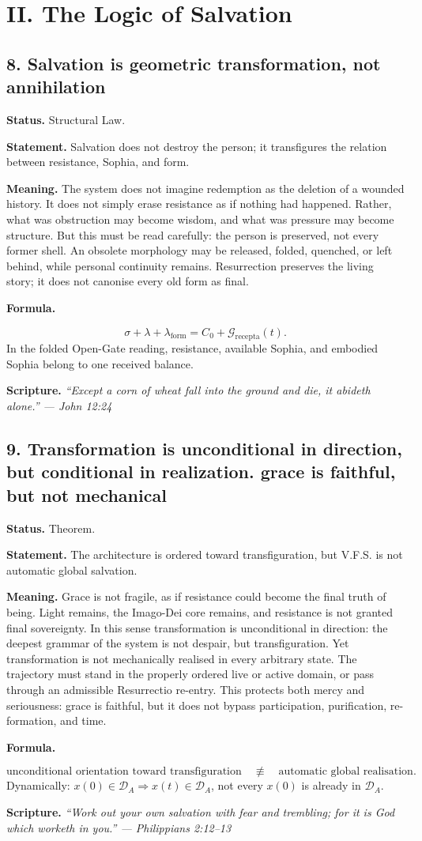 \documentclass[11pt]{article}
\newcommand{\Grec}{\mathcal{G}_{\mathrm{recepta}}}
\newcommand{\DA}{\mathcal{D}_A}
\newcommand{\lform}{\lambda_{\mathrm{form}}}
\newcommand{\thesis}[2]{%
  \subsection*{#1. #2}%
}
\newcommand{\status}[1]{\textbf{Status.} #1\par}
\newcommand{\statement}[1]{\textbf{Statement.} #1\par}
\newcommand{\explain}[1]{\textbf{Meaning.} #1\par}
\newcommand{\formula}[1]{\textbf{Formula.}\par #1\par}
\newcommand{\scripture}[2]{\textbf{Scripture.} {\small\itshape ``#1'' --- #2}\par}
\begin{document}
\section{II. The Logic of Salvation}

\thesis{8}{Salvation is geometric transformation, not annihilation}
\status{Structural Law.}
\statement{Salvation does not destroy the person; it transfigures the relation between resistance, Sophia, and form.}
\explain{The system does not imagine redemption as the deletion of a wounded history. It does not simply erase resistance as if nothing had happened. Rather, what was obstruction may become wisdom, and what was pressure may become structure. But this must be read carefully: the person is preserved, not every former shell. An obsolete morphology may be released, folded, quenched, or left behind, while personal continuity remains. Resurrection preserves the living story; it does not canonise every old form as final.}
\formula{\[
  \sigma+\lambda+\lform=C_0+\Grec(t).
\]
In the folded Open-Gate reading, resistance, available Sophia, and embodied Sophia belong to one received balance.}
\scripture{Except a corn of wheat fall into the ground and die, it abideth alone.}{John 12:24}

\thesis{9}{Transformation is unconditional in direction, but conditional in realization. grace is faithful, but not mechanical}
\status{Theorem.}
\statement{The architecture is ordered toward transfiguration, but V.F.S. is not automatic global salvation.}
\explain{Grace is not fragile, as if resistance could become the final truth of being. Light remains, the Imago-Dei core remains, and resistance is not granted final sovereignty. In this sense transformation is unconditional in direction: the deepest grammar of the system is not despair, but transfiguration. Yet transformation is not mechanically realised in every arbitrary state. The trajectory must stand in the properly ordered live or active domain, or pass through an admissible Resurrectio re-entry. This protects both mercy and seriousness: grace is faithful, but it does not bypass participation, purification, re-formation, and time.}
\formula{\[
  \text{unconditional orientation toward transfiguration}
  \quad\not\equiv\quad
  \text{automatic global realisation}.
\]
Dynamically: \(x(0)\in\DA\Rightarrow x(t)\in\DA\), not every \(x(0)\) is already in \(\DA\).}
\scripture{Work out your own salvation with fear and trembling; for it is God which worketh in you.}{Philippians 2:12--13}
\end{document}
